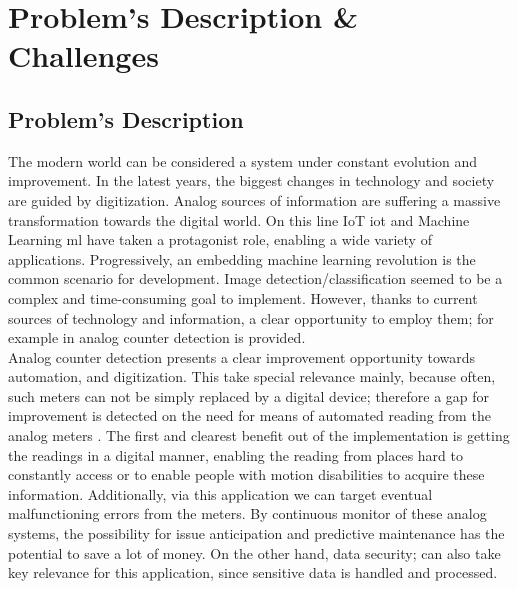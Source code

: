 %
%
%
%

\graphicspath{ {./images/} }


\chapter{Problem's Description \& Challenges}

\section{Problem's Description}

The modern world can be considered a system under constant evolution and improvement. In the latest years, the biggest changes in technology and society are guided by digitization. Analog sources of information are suffering a massive transformation towards the digital world. On this line IoT \ac{iot} and Machine Learning \ac{ml} have taken a protagonist role, enabling a wide variety of applications. Progressively, an embedding machine learning revolution is the common scenario for development. Image detection/classification seemed to be a complex and time-consuming goal to implement. However,  thanks to current sources of technology and information, a clear opportunity to employ them; for example in analog counter detection is provided.\\

Analog counter detection presents a clear improvement opportunity towards automation, and digitization. This take special relevance mainly, because often, such meters can not be simply replaced by a digital device; therefore a gap for improvement is detected on the need for means of automated reading from the analog meters \autocite{Alexeev:2020}.  The first and clearest benefit out of the implementation is getting the readings in a digital manner, enabling the reading from places hard to constantly access or to enable people with motion disabilities to acquire these information. Additionally, via this application we can target eventual malfunctioning errors from the meters. By continuous monitor of these analog systems, the possibility for issue anticipation and predictive maintenance has the potential to save a lot of money. On the other hand, data security; can also take key relevance for this application, since sensitive data is handled and processed.

